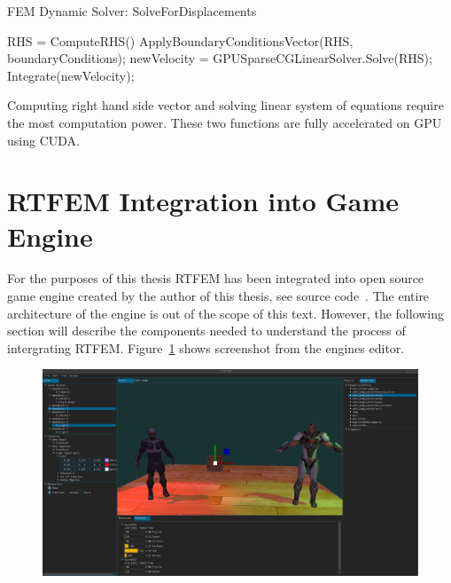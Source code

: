 \documentclass[en]{minipw} %
\begin{document}
\begin{algorithm}
\caption{FEM Dynamic Solver: SolveForDisplacements}
\label{alg:SolveForDisplacements}
\begin{algorithmic}[1]
\State RHS = ComputeRHS()
\State ApplyBoundaryConditionsVector(RHS, boundaryConditions);
\State newVelocity = GPUSparseCGLinearSolver.Solve(RHS);
\State Integrate(newVelocity);
\EndProcedure
\end{algorithmic}
\end{algorithm}

Computing right hand side vector and solving linear system of equations require the most computation power. These two functions are fully accelerated on GPU using CUDA.

\section{RTFEM Integration into Game Engine}
For the purposes of this thesis RTFEM has been integrated into open source game engine created by the author of this thesis, see source code~\cite{ifx}. The entire architecture of the engine is out of the scope of this text. However, the following section will describe the components needed to understand the process of intergrating RTFEM. Figure~\ref{fig:ifx_example} shows screenshot from the engines editor.

\begin{figure}[h!]
\centering
\includegraphics[scale=0.3]{pictures/ifx/ifx.png}
\caption[Logo MiNI]{}
\label{fig:ifx_example}
\end{figure}
\end{document}
